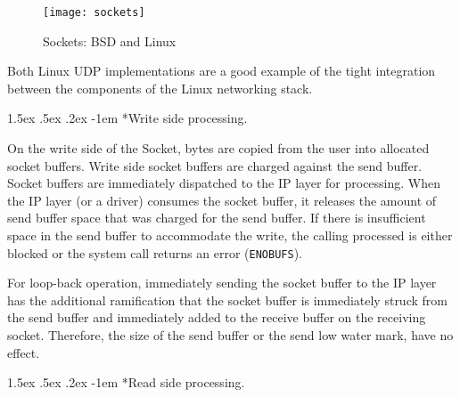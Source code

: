 \documentclass[letterpaper,final,notitlepage,twocolumn,10pt,twoside]{article}
\makeatletter
\renewcommand\paragraph{\@startsection{paragraph}{4}{\z@}%
                                    {1.5ex \@plus .5ex \@minus .2ex}%
                                    {-1em}%
                                    {\normalfont\normalsize\bfseries\slshape}}
\makeatother
\begin{document}
\begin{figure}[htp]
\center\texttt{[image: sockets]}
\caption[Sockets: BSD and Linux]{Sockets: BSD and Linux}
\label{figure:sockets}
\end{figure}

Both Linux UDP implementations are
a good example of the tight integration between the components of the Linux networking stack.

\paragraph*{Write side processing.}

On the write side of the Socket, bytes are copied from the user into allocated socket buffers.
Write side socket buffers are charged against the send buffer.  Socket buffers are immediately
dispatched to the IP layer for processing.  When the IP layer (or a driver) consumes the socket
buffer, it releases the amount of send buffer space that was charged for the send buffer.  If there
is insufficient space in the send buffer to accommodate the write, the calling processed is either
blocked or the system call returns an error (\texttt{ENOBUFS}).

For loop-back operation, immediately sending the socket buffer to the IP layer has the additional
ramification that the socket buffer is immediately struck from the send buffer and immediately added
to the receive buffer on the receiving socket.  Therefore, the size of the send buffer or the send
low water mark, have no effect.




\paragraph*{Read side processing.}
\end{document}
